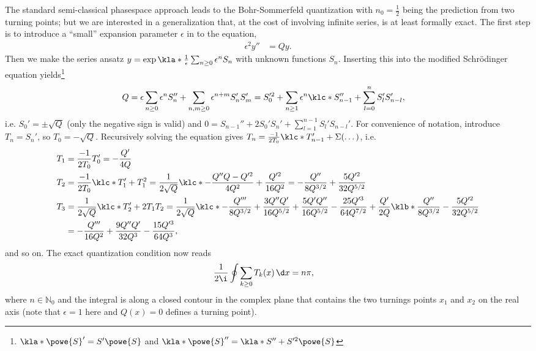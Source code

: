 \documentclass[english, parskip=full]{scrartcl}
\begin{document}
The standard semi-classical phasespace approach leads to the Bohr-Sommerfeld quantization with $n_0=\frac{1}{2}$ being the prediction from two turning points; but we are interested in a generalization that, at the cost of involving infinite series, is at least formally exact.
The first step is to introduce a ``small'' expansion parameter $\epsilon$ in to the equation,
\begin{align}
\epsilon^2 y'' &= Qy.
\end{align}
Then we make the series ansatz $y=\exp\kla*{\frac{1}{\epsilon}\sum_{n\ge 0} \epsilon^n S_n}$ with unknown functions $S_n$.
Inserting this into the modified Schrödinger equation yields\footnote{$\kla*{\powe{S}}' = S'\powe{S}$ and $\kla*{\powe{S}}'' = \kla*{S'' + S'^2}\powe{S}$}
\begin{align}
Q &= \epsilon \sum_{n\ge 0} \epsilon^n S_n'' + \sum_{n,m\ge 0} \epsilon^{n+m} S_n'S_m' = S_0'^2 + \sum_{n\ge 1} \epsilon^n \klc*{S_{n-1}'' + \sum_{l=0}^n S_l' S_{n-l}'},
\end{align}
i.e. $S_0' = \pm \sqrt{Q}$ (only the negative sign is valid) and $0=S_{n-1}'' + 2S_0'S_n' + \sum_{l=1}^{n-1} S_l'S_{n-l}'$.
For convenience of notation, introduce $T_n=S_n'$, so $T_0=-\sqrt{Q}$.
Recursively solving the equation gives $T_n = \frac{-1}{2T_0} \klc*{T_{n-1}' + \Sigma (\dots)}$, i.e.
\begin{align*}
T_1 &= \frac{-1}{2T_0} T_0' = -\frac{Q'}{4Q}\\
T_2 &= \frac{-1}{2T_0} \klc*{T_1' + T_1^2} = \frac{1}{2\sqrt{Q}} \klc*{-\frac{Q''Q - Q'^2}{4Q^2} + \frac{Q'^2}{16Q^2}} = -\frac{Q''}{8Q^{3/2}} + \frac{5Q'^2}{32Q^{5/2}}\\
T_3 &= \frac{1}{2\sqrt{Q}} \klc*{T_2' + 2T_1T_2} = \frac{1}{2\sqrt{Q}} \klc*{-\frac{Q'''}{8Q^{3/2}} + \frac{3Q''Q'}{16Q^{5/2}} + \frac{5Q'Q''}{16Q^{5/2}} - \frac{25Q'^3}{64Q^{7/2}} +\frac{Q'}{2Q}\klb*{\frac{Q''}{8Q^{3/2}} - \frac{5Q'^2}{32Q^{5/2}}}}\\
&= -\frac{Q'''}{16Q^2} + \frac{9Q''Q'}{32Q^3} - \frac{15Q'^3}{64Q^3},
\end{align*}
and so on.
The exact quantization condition now reads
\begin{align}
\frac{1}{2\i} \oint\sum_{k\ge 0} T_k(x)\,\d x &= n\pi,
\end{align}
where $n\in\mathbb{N}_0$ and the integral is along a closed contour in the complex plane that contains the two turnings points $x_1$ and $x_2$ on the real axis (note that $\epsilon=1$ here and $Q(x)=0$ defines a turning point).
\end{document}
